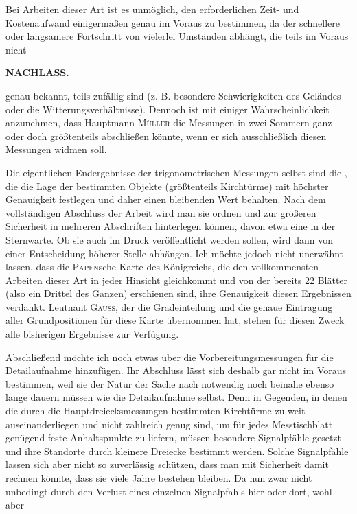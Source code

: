 \par\noindent\hspace*{\parindent}Bei Arbeiten dieser Art ist es unmöglich, den erforderlichen Zeit- und Kostenaufwand einigermaßen genau im Voraus zu bestimmen, da der schnellere oder langsamere Fortschritt von vielerlei Umständen abhängt, die teils im Voraus nicht

\par\clearpage
\noindent{}\hfill{\small\textbf{NACHLASS.}}\hfill\null\par\medskip

\noindent genau bekannt, teils zufällig sind (z. B. besondere Schwierigkeiten des Geländes oder die Witterungsverhältnisse). Dennoch ist mit einiger Wahrscheinlichkeit anzunehmen, dass Hauptmann \textsc{Müller} die Messungen in zwei Sommern ganz oder doch größtenteils abschließen könnte, wenn er sich ausschließlich diesen Messungen widmen soll.

\par\medskip
\par\noindent\hspace*{\parindent}Die eigentlichen Endergebnisse der trigonometrischen Messungen selbst sind die , die die Lage der bestimmten Objekte (größtenteils Kirchtürme) mit höchster Genauigkeit festlegen und daher einen bleibenden Wert behalten. Nach dem vollständigen Abschluss der Arbeit wird man sie ordnen und zur größeren Sicherheit in mehreren Abschriften hinterlegen können, davon etwa eine in der Sternwarte. Ob sie auch im Druck veröffentlicht werden sollen, wird dann von einer Entscheidung höherer Stelle abhängen. Ich möchte jedoch nicht unerwähnt lassen, dass die \textsc{Papen}sche Karte des Königreichs, die den vollkommensten Arbeiten dieser Art in jeder Hinsicht gleichkommt und von der bereits 22 Blätter (also ein Drittel des Ganzen) erschienen sind, ihre Genauigkeit diesen Ergebnissen verdankt. Leutnant \textsc{Gauss}, der die Gradeinteilung und die genaue Eintragung aller Grundpositionen für diese Karte übernommen hat, stehen für diesen Zweck alle bisherigen Ergebnisse zur Verfügung.

\par\medskip
\par\noindent\hspace*{\parindent}Abschließend möchte ich noch etwas über die Vorbereitungsmessungen für die Detailaufnahme hinzufügen. Ihr Abschluss lässt sich deshalb gar nicht im Voraus bestimmen, weil sie der Natur der Sache nach notwendig noch beinahe ebenso lange dauern müssen wie die Detailaufnahme selbst. Denn in Gegenden, in denen die durch die Hauptdreiecksmessungen bestimmten Kirchtürme zu weit auseinanderliegen und nicht zahlreich genug sind, um für jedes Messtischblatt genügend feste Anhaltspunkte zu liefern, müssen besondere Signalpfähle gesetzt und ihre Standorte durch kleinere Dreiecke bestimmt werden. Solche Signalpfähle lassen sich aber nicht so zuverlässig schützen, dass man mit Sicherheit damit rechnen könnte, dass sie viele Jahre bestehen bleiben. Da nun zwar nicht unbedingt durch den Verlust eines einzelnen Signalpfahls hier oder dort, wohl aber

